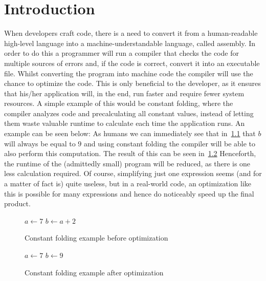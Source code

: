 \chapter{Introduction}\label{sec:intro}



When developers craft code, there is a need to convert it from a human-readable high-level language into a machine-understandable language, called assembly.
In order to do this a programmer will run a compiler that checks the code for multiple sources of errors and, if the code is correct, convert it into an executable file.
Whilst converting the program into machine code the compiler will use the chance to optimize the code.
This is only beneficial to the developer, as it ensures that his/her application will, in the end, run faster and require fewer system resources.
A simple example of this would be constant folding, where the compiler analyzes code and precalculating all constant values, instead of letting them waste valuable runtime to calculate each time the application runs.
An example can be seen below:
As humans we can immediately see that in~\cref{fig:intro:cf1} that $b$ will always be equal to $9$ and using constant folding the compiler will be able to also perform this computation.
The result of this can be seen in~\cref{fig:intro:cf2}
Henceforth, the runtime of the (admittedly small) program will be reduced, as there is one less calculation required.
Of course, simplifying just one expression seems (and for a matter of fact is) quite useless, but in a real-world code, an optimization like this is possible for many expressions and hence do noticeably speed up the final product.
\begin{figure}[h]
    \begin{algorithmic}
        \State $a \gets 7$
        \State $b \gets a + 2$
    \end{algorithmic}
    \caption{Constant folding example before optimization}
    \label{fig:intro:cf1}
\end{figure}
\begin{figure}[h]
    \begin{algorithmic}
        \State $a \gets 7$
        \State $b \gets 9$
    \end{algorithmic}
    \caption{Constant folding example after optimization}
    \label{fig:intro:cf2}
\end{figure}

